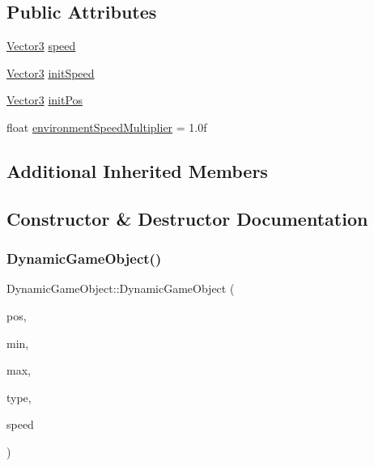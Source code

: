 \subsection*{Public Attributes}
\begin{DoxyCompactItemize}
\item 
\hyperlink{class_vector3}{Vector3} \hyperlink{class_dynamic_game_object_a54cb8a3a5fe8314cd5751f223b2b49ae}{speed}
\item 
\hyperlink{class_vector3}{Vector3} \hyperlink{class_dynamic_game_object_a43bcea908ce101c1060dfec7eb3099a9}{init\+Speed}
\item 
\hyperlink{class_vector3}{Vector3} \hyperlink{class_dynamic_game_object_a3bb99e52ae5e37dd3b309e80c2262c82}{init\+Pos}
\item 
float \hyperlink{class_dynamic_game_object_a0816663ea0effab6d4b441600aa38b59}{environment\+Speed\+Multiplier} = 1.\+0f
\end{DoxyCompactItemize}
\subsection*{Additional Inherited Members}


\subsection{Constructor \& Destructor Documentation}
\mbox{\label{class_dynamic_game_object_ab7d7036c283760e0035d39713a82016a}} 
\subsubsection{\texorpdfstring{Dynamic\+Game\+Object()}{DynamicGameObject()}}
{\footnotesize\ttfamily Dynamic\+Game\+Object\+::\+Dynamic\+Game\+Object (\begin{DoxyParamCaption}\item[{\hyperlink{class_vector3}{Vector3}}]{pos,  }\item[{\hyperlink{class_vector3}{Vector3}}]{min,  }\item[{\hyperlink{class_vector3}{Vector3}}]{max,  }\item[{\hyperlink{_game_object_8h_a57678b60d65afb213d04a6b090c64a08}{Game\+Object\+Type}}]{type,  }\item[{\hyperlink{class_vector3}{Vector3}}]{speed }\end{DoxyParamCaption})\hspace{0.3cm}{\ttfamily [inline]}}



